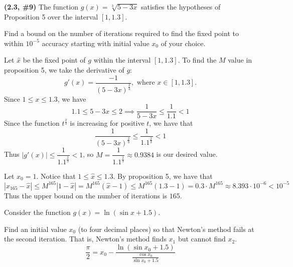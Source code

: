 \documentclass{eh-homework}
\begin{document}
    \newpage
    \begin{question}{2}
    \textbf{(2.3, \#9)} The function \(g(x) = \sqrt[3]{5 - 3x}\) satisfies the hypotheses of Proposition 5 over the interval \([1, 1.3]\).
    
    Find a bound on the number of iterations required to find the fixed point to within \(10^{-5}\) accuracy starting with initial value \(x_0\) of your choice.

    Let \(\hat{x}\) be the fixed point of \(g\) within the interval \([1, 1.3]\). To find the \(M\) value in proposition 5, we take the derivative of \(g\):
    \[
        g'(x) = \frac{-1}{(5-3x)^{\frac{2}{3}}}, \text{ where } x \in [1,1.3].
    \]
    Since \(1 \leq x \leq 1.3\), we have
    \[
        1.1 \leq 5 - 3x \leq 2 \implies \frac{1}{5-3x} \leq \frac{1}{1.1} < 1
    \]
    Since the function \(t^{\frac{2}{3}}\) is increasing for positive \(t\), we have that
    \[
        \frac{1}{(5-3x)^{\frac{2}{3}}} \leq \frac{1}{1.1^{\frac{2}{3}}} < 1
    \]
    Thus \(|g'(x)| \leq \dfrac{1}{1.1^{\frac{2}{3}}} < 1\), so \(M = \dfrac{1}{1.1^{\frac{2}{3}}} \approx 0.9384\) is our desired value.

    Let \(x_0 = 1\). Notice that \(1 \leq \hat{x} \leq 1.3\). By proposition 5, we have that
    \[
        |x_{165} - \hat{x}| \leq M^{165} |1 - \hat{x}| = M^{165} (\hat{x} - 1) \leq M^{165} (1.3 - 1) = 0.3 \cdot M^{165} \approx 8.393 \cdot 10^{-6} < 10^{-5}
    \]
    Thus the upper bound on the number of iterations is \(165\).

    \end{question}
    \newpage
    \begin{question}{3}
    Consider the function \(g(x) = \ln(\sin x + 1.5)\).
    
    Find an initial value \(x_0\) (to four decimal places) so that Newton’s method fails at the second iteration. That is, Newton’s method finds \(x_1\) but cannot find \(x_2\).
    \[
        \frac{\pi}{2} = x_0 - \frac{\ln (\sin x_0 + 1.5)}{\frac{\cos x_0}{\sin x_0 + 1.5}}
    \]

    \end{question}
    \newpage
\end{document}
